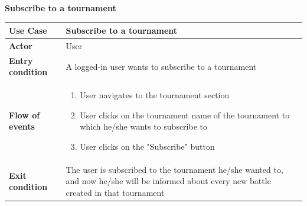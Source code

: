\documentclass[../RASD.tex]{subfiles}
\begin{document}
        \restoregeometry
        \textbf{Subscribe to a tournament}
        \begin{table}[ht]
            \begin{center}
                \begin{tabular}{|m{10em}|m{30em}|}
                \hline
                \textbf{Use Case} & Subscribe to a tournament\\
                \hline
                \textbf{Actor} & User\\
                \hline
                \textbf{Entry condition} & A logged-in user wants to subscribe to a tournament\\
                \hline
                \textbf{Flow of events} & 
                    \begin{enumerate}
                        \item User navigates to the tournament section
                        \item User clicks on the tournament name of the tournament to which he/she wants to subscribe to
                        \item User clicks on the "Subscribe" button
                    \end{enumerate}\\
                \hline
                \textbf{Exit condition} & The user is subscribed to the tournament he/she wanted to, and now he/she will be informed about every new battle created in that tournament\\
                \hline
                \end{tabular}
            \end{center}
        \end{table}\newpage
\end{document}
